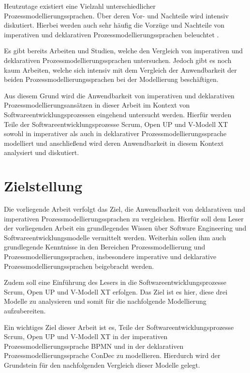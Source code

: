 Heutzutage existiert eine Vielzahl unterschiedlicher Prozessmodellierungssprachen. Über deren Vor- und Nachteile wird intensiv diskutiert. Hierbei werden auch sehr häufig die Vorzüge und Nachteile von imperativen und deklarativen Prozessmodellierungssprachen beleuchtet \cite{fahland2010}. \newline

Es gibt bereits Arbeiten und Studien, welche den Vergleich von imperativen und deklarativen Prozessmodellierungssprachen untersuchen. Jedoch gibt es noch kaum Arbeiten, welche sich intensiv mit dem Vergleich der Anwendbarkeit der beiden Prozessmodellierungssprachen bei der Modellierung beschäftigen.\newline

Aus diesem Grund wird die Anwendbarkeit von imperativen und deklarativen Prozessmodellierungsansätzen in dieser Arbeit im Kontext von Softwareentwicklungsprozessen eingehend untersucht werden. Hierfür werden Teile der Softwareentwicklungsprozesse Scrum, Open UP und V-Modell XT sowohl in imperativer als auch in deklarativer Prozessmodellierungssprache modelliert und anschließend wird deren Anwendbarkeit in diesem Kontext analysiert und diskutiert.\newline



\section{Zielstellung}
Die vorliegende Arbeit verfolgt das Ziel, die Anwendbarkeit von deklarativen und imperativen Prozessmodellierungssprachen zu vergleichen. Hierfür soll dem Leser der vorliegenden Arbeit ein grundlegendes Wissen über Software Engineering und Softwareentwicklungsmodelle vermittelt werden. Weiterhin sollen ihm auch grundlegende Kenntnisse in den Bereichen Prozessmodellierung und Prozessmodellierungssprachen, insbesondere imperative und deklarative Prozessmodellierungssprachen beigebracht werden. \newline

Zudem soll eine Einführung des Lesers in die Softwareentwicklungsprozesse Scrum, Open UP und V-Modell XT erfolgen. Das Ziel ist es hier, diese drei Modelle zu analysieren und somit für die nachfolgende Modellierung aufzubereiten.\newline

Ein wichtiges Ziel dieser Arbeit ist es, Teile der Softwareentwicklungsprozesse Scrum, Open UP und V-Modell XT in der imperativen Prozessmodellierungssprache BPMN und in der deklarativen Prozessmodellierungssprache ConDec zu modellieren. Hierdurch wird der Grundstein für den nachfolgenden Vergleich dieser Modelle gelegt.\newline

